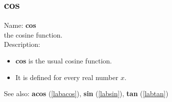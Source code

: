 \subsection{cos}
\label{labcos}
\noindent Name: \textbf{cos}\\
the cosine function.\\
\noindent Description: \begin{itemize}

\item \textbf{cos} is the usual cosine function.

\item It is defined for every real number $x$.
\end{itemize}
See also: \textbf{acos} (\ref{labacos}), \textbf{sin} (\ref{labsin}), \textbf{tan} (\ref{labtan})
